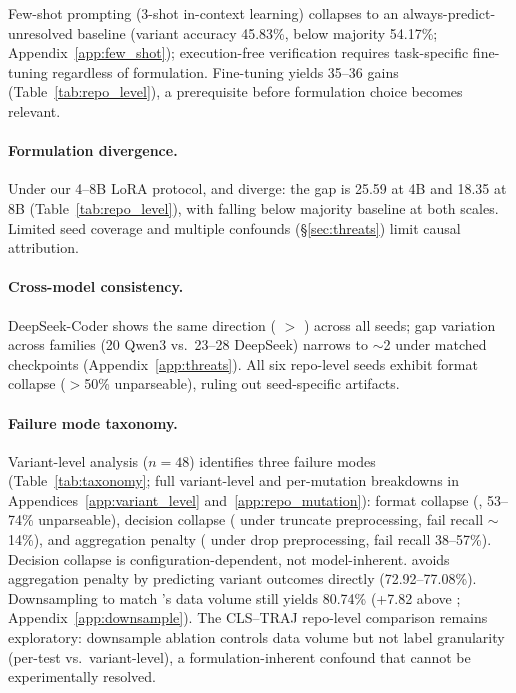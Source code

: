 Few-shot prompting (3-shot in-context learning) collapses to an always-predict-unresolved baseline (variant accuracy 45.83\%, below majority 54.17\%; Appendix~\ref{app:few_shot}); execution-free verification requires task-specific fine-tuning regardless of formulation. Fine-tuning yields 35--36\pp{} gains (Table~\ref{tab:repo_level}), a prerequisite before formulation choice becomes relevant.

\paragraph{Formulation divergence.} Under our 4--8B LoRA protocol, \cls{} and \cwm{} diverge: the gap is 25.59\pp{} at 4B and 18.35\pp{} at 8B (Table~\ref{tab:repo_level}), with \cwm{} falling below majority baseline at both scales. Limited seed coverage and multiple confounds (\S\ref{sec:threats}) limit causal attribution.

\paragraph{Cross-model consistency.} DeepSeek-Coder shows the same direction (\cls{} $>$ \cwm{}) across all seeds; gap variation across families (20\pp{} Qwen3 vs.\ 23--28\pp{} DeepSeek) narrows to ${\sim}$2\pp{} under matched checkpoints (Appendix~\ref{app:threats}). All six \cwm{} repo-level seeds exhibit format collapse ($>$50\% unparseable), ruling out seed-specific artifacts.

\paragraph{Failure mode taxonomy.} Variant-level analysis ($n{=}48$) identifies three failure modes (Table~\ref{tab:taxonomy}; full variant-level and per-mutation breakdowns in Appendices~\ref{app:variant_level} and~\ref{app:repo_mutation}): format collapse (\cwm{}, 53--74\% unparseable), decision collapse (\cls{} under truncate preprocessing, fail recall ${\sim}$14\%), and aggregation penalty (\cls{} under drop preprocessing, fail recall 38--57\%). Decision collapse is configuration-dependent, not model-inherent. \traj{} avoids aggregation penalty by predicting variant outcomes directly (72.92--77.08\%). Downsampling \cls{} to match \traj{}'s data volume still yields 80.74\% (+7.82\pp{} above \traj{}; Appendix~\ref{app:downsample}). The CLS--TRAJ repo-level comparison remains exploratory: downsample ablation controls data volume but not label granularity (per-test vs.\ variant-level), a formulation-inherent confound that cannot be experimentally resolved.


